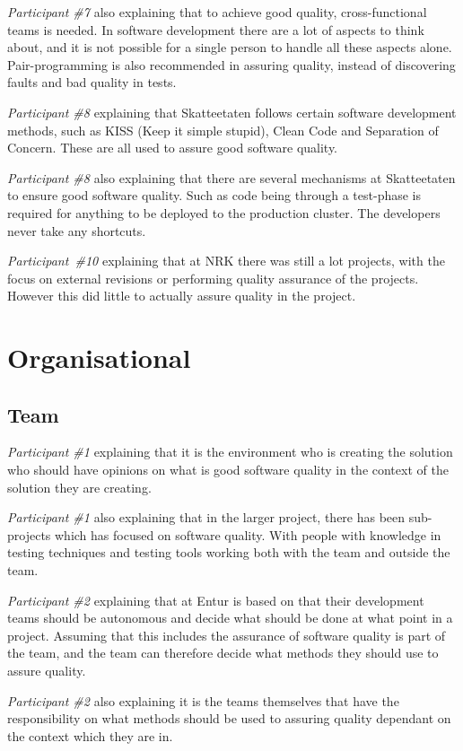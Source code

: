 \textit{Participant \#7} also explaining that to achieve good quality, cross-functional teams is needed. In software development there are a lot of aspects to think about, and it is not possible for a single person to handle all these aspects alone. Pair-programming is also recommended in assuring quality, instead of discovering faults and bad quality in tests.


\textit{Participant \#8} explaining that Skatteetaten follows certain software development methods, such as KISS (Keep it simple stupid), Clean Code and Separation of Concern. These are all used to assure good software quality.

\textit{Participant \#8} also explaining that there are several mechanisms at Skatteetaten to ensure good software quality. Such as code being through a test-phase is required for anything to be deployed to the production cluster. The developers never take any shortcuts. 

\textit{Participant \#10} explaining that at NRK there was still a lot projects, with the focus on external revisions or performing quality assurance of the projects. However this did little to actually assure quality in the project.

\section{Organisational}
\subsection{Team}
\textit{Participant \#1} explaining that it is the environment who is creating the solution who should have opinions on what is good software quality in the context of the solution they are creating.

\textit{Participant \#1} also explaining that in the larger project, there has been sub-projects which has focused on software quality. With people with knowledge in testing techniques and testing tools working both with the team and outside the team.

\textit{Participant \#2} explaining that at Entur is based on that their development teams should be autonomous and decide what should be done at what point in a project. Assuming that this includes the assurance of software quality is part of the team, and the team can therefore decide what methods they should use to assure quality.

\textit{Participant \#2} also explaining it is the teams themselves that have the responsibility on what methods should be used to assuring quality dependant on the context which they are in.

